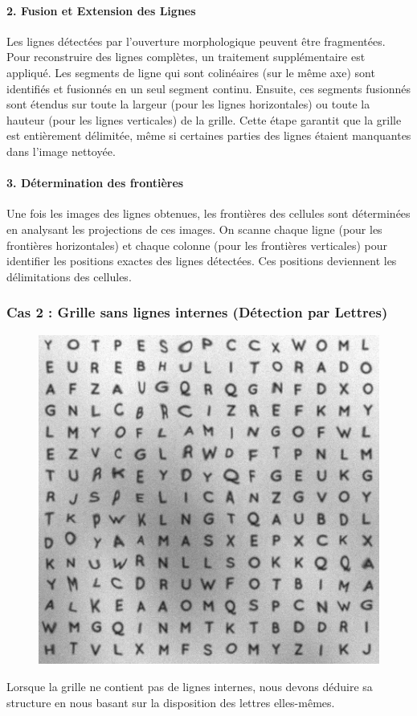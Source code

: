 \documentclass{article}
\begin{document}
\paragraph{2. Fusion et Extension des Lignes}
Les lignes détectées par l'ouverture morphologique peuvent être fragmentées. Pour reconstruire des lignes complètes, un traitement supplémentaire est appliqué. Les segments de ligne qui sont colinéaires (sur le même axe) sont identifiés et fusionnés en un seul segment continu. Ensuite, ces segments fusionnés sont étendus sur toute la largeur (pour les lignes horizontales) ou toute la hauteur (pour les lignes verticales) de la grille. Cette étape garantit que la grille est entièrement délimitée, même si certaines parties des lignes étaient manquantes dans l'image nettoyée.

\paragraph{3. Détermination des frontières}
Une fois les images des lignes obtenues, les frontières des cellules sont déterminées en analysant les projections de ces images. On scanne chaque ligne (pour les frontières horizontales) et chaque colonne (pour les frontières verticales) pour identifier les positions exactes des lignes détectées. Ces positions deviennent les délimitations des cellules.

\subsubsection{Cas 2 : Grille sans lignes internes (Détection par Lettres)}

\begin{figure}[H]
  \centering
      \includegraphics[width=\linewidth]{ressources/image_3_step_08_text_region.png}
      \caption{}
    \endminipage\hfill
\end{figure}
Lorsque la grille ne contient pas de lignes internes, nous devons déduire sa structure en nous basant sur la disposition des lettres elles-mêmes.
\end{document}
